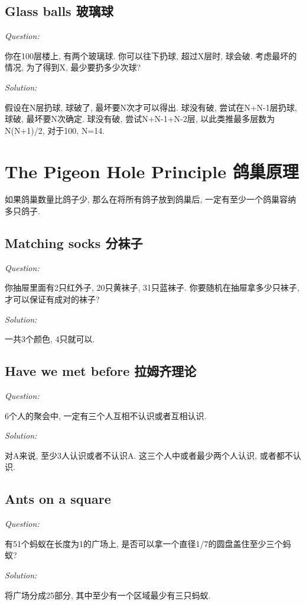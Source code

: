\documentclass[12pt]{book}
\begin{document}
\subsection{Glass balls 玻璃球}
\noindent \textit{Question:}

你在100层楼上, 有两个玻璃球. 你可以往下扔球, 超过X层时, 球会破. 考虑最坏的情况, 为了得到X, 最少要扔多少次球?

\noindent \textit{Solution:} 

假设在N层扔球, 球破了, 最坏要N次才可以得出. 球没有破, 尝试在N+N-1层扔球, 球破, 最坏要N次确定. 球没有破, 尝试N+N-1+N-2层, 以此类推最多层数为N(N+1)/2, 对于100, N=14.

\section{The Pigeon Hole Principle 鸽巢原理}
如果鸽巢数量比鸽子少, 那么在将所有鸽子放到鸽巢后, 一定有至少一个鸽巢容纳多只鸽子.

\subsection{Matching socks 分袜子}
\noindent \textit{Question:}

你抽屉里面有2只红外子, 20只黄袜子, 31只蓝袜子. 你要随机在抽屉拿多少只袜子, 才可以保证有成对的袜子?

\noindent \textit{Solution:} 

一共3个颜色, 4只就可以.

\subsection{Have we met before 拉姆齐理论}
\noindent \textit{Question:}

6个人的聚会中, 一定有三个人互相不认识或者互相认识.

\noindent \textit{Solution:} 

对A来说, 至少3人认识或者不认识A. 这三个人中或者最少两个人认识, 或者都不认识.

\subsection{Ants on a square}
\noindent \textit{Question:}

有51个蚂蚁在长度为1的广场上, 是否可以拿一个直径1/7的圆盘盖住至少三个蚂蚁?

\noindent \textit{Solution:} 

将广场分成25部分, 其中至少有一个区域最少有三只蚂蚁.
\end{document}
